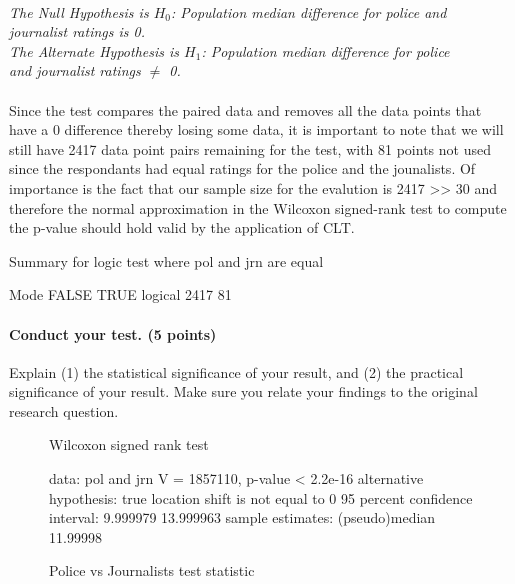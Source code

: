 \documentclass[12pt]{article}
\begin{document}
\paragraph{}
\parbox{\textwidth}{\emph{The Null Hypothesis is $H_0$: Population median difference for police and \\ journalist ratings is 0.\\
The Alternate Hypothesis is $H_1$: Population median difference for police \\ and journalist ratings $\neq$ 0.}}

\paragraph{}
Since the test compares the paired data and removes all the data points that have a 0 difference thereby losing some data, it is important to note that we will still have 2417 data point pairs remaining for the test, with 81 points not used since the respondants had equal ratings for the police and the jounalists. Of importance is the fact that our sample size for the evalution is 2417 >> 30 and therefore the normal approximation in the Wilcoxon signed-rank test to compute the p-value should hold valid by the application of CLT.

\begin{Schunk}
\begin{Soutput}
Summary for logic test where pol and jrn are equal
\end{Soutput}
\begin{Soutput}
   Mode   FALSE    TRUE 
logical    2417      81 
\end{Soutput}
\end{Schunk}


\paragraph{Conduct your test. (5 points)}
Explain (1) the statistical significance of your result, and (2) the practical significance of your result. Make sure you relate your findings to the original research question.
\begin{figure}[H]
\begin{Schunk}
\begin{Soutput}
	Wilcoxon signed rank test

data:  pol and jrn
V = 1857110, p-value < 2.2e-16
alternative hypothesis: true location shift is not equal to 0
95 percent confidence interval:
  9.999979 13.999963
sample estimates:
(pseudo)median 
      11.99998 
\end{Soutput}
\end{Schunk}
\caption{Police vs Journalists test statistic}
\end{figure}
\end{document}
